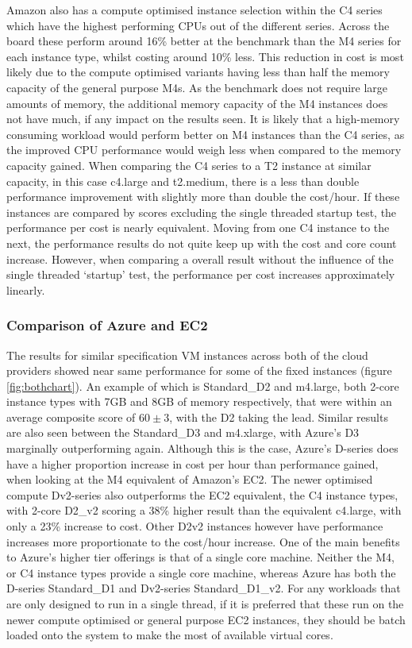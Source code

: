 \documentclass{entcs} \usepackage{entcsmacro}
\begin{document}
Amazon also has a compute optimised instance selection within the C4 series which have the highest performing CPUs out of the different series. Across the board these perform around 16\% better at the benchmark than the M4 series for each instance type, whilst costing around 10\% less. This reduction in cost is most likely due to the compute optimised variants having less than half the memory capacity of the general purpose M4s. As the benchmark does not require large amounts of memory, the additional memory capacity of the M4 instances does not have much, if any impact on the results seen. It is likely that a high-memory consuming workload would perform better on M4 instances than the C4 series, as the improved CPU performance would weigh less when compared to the memory capacity gained. When comparing the C4 series to a T2 instance at similar capacity, in this case c4.large and t2.medium, there is a less than double performance improvement with slightly more than double the cost/hour. If these instances are compared by scores excluding the single threaded startup test, the performance per cost is nearly equivalent. Moving from one C4 instance to the next, the performance results do not quite keep up with the cost and core count increase. However, when comparing a overall result without the influence of the single threaded `startup' test, the performance per cost increases approximately linearly.


\subsubsection{Comparison of Azure and EC2}

The results for similar specification VM instances across both of the cloud providers showed near same performance for some of the fixed instances (figure \ref{fig:bothchart}). An example of which is Standard\_D2 and m4.large, both 2-core instance types with 7GB and 8GB of memory respectively, that were within an average composite score of $60\pm3$, with the D2 taking the lead. Similar results are also seen between the Standard\_D3 and m4.xlarge, with Azure's D3 marginally outperforming again. Although this is the case, Azure's D-series does have a higher proportion increase in cost per hour than performance gained, when looking at the M4 equivalent of Amazon's EC2. The newer optimised compute Dv2-series also outperforms the EC2 equivalent, the C4 instance types, with 2-core D2\_v2 scoring a 38\% higher result than the equivalent c4.large, with only a 23\% increase to cost. Other D2v2 instances however have performance increases more proportionate to the cost/hour increase. One of the main benefits to Azure's higher tier offerings is that of a single core machine. Neither the M4, or C4 instance types provide a single core machine, whereas Azure has both the D-series Standard\_D1 and Dv2-series Standard\_D1\_v2. For any workloads that are only designed to run in a single thread, if it is preferred that these run on the newer compute optimised or general purpose EC2 instances, they should be batch loaded onto the system to make the most of available virtual cores.
\end{document}
